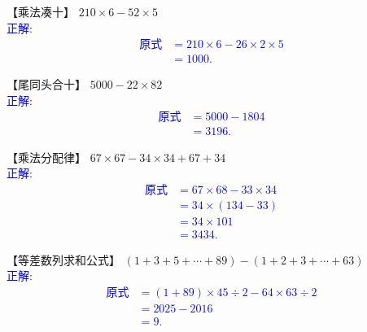 \item {
    【乘法凑十】
    $210\times 6 - 52\times 5$
    \ifshowSolution
        \\\fangsong{}\textcolor{blue}{
            正解:
            \begin{align*}
                \mbox{原式} &= 210\times 6 - 26\times 2\times 5 \\
                &= 1000.
            \end{align*}
        }
    \else
        \vspace{1cm}
    \fi
}

\item {
    【尾同头合十】
    $5000- 22\times 82$  
    \ifshowSolution
        \\\fangsong{}\textcolor{blue}{
            正解:
            \begin{align*}
                \mbox{原式} &= 5000- 1804 \\
                &= 3196.
            \end{align*}
        }
    \else
        \vspace{1cm}
    \fi
}

\item {
    【乘法分配律】
    $67\times 67 - 34\times 34 + 67 + 34$
    \ifshowSolution
        \\\fangsong{}\textcolor{blue}{
            正解:
            \begin{align*}
                \mbox{原式} &= 67\times 68 - 33\times 34 \\
                &= 34\times (134 - 33) \\
                &= 34\times 101 \\
                &= 3434.
            \end{align*}
    }
    \else
        \vspace{1cm}
    \fi
}

\item {
    【等差数列求和公式】
    $(1+3+5+\cdots + 89) - (1+2+3+\cdots + 63)$  
    \ifshowSolution
        \\\fangsong{}\textcolor{blue}{
            正解:
            \begin{align*}
                \mbox{原式} &= (1+ 89) \times 45 \div 2 - 64\times 63\div 2 \\
                &= 2025 - 2016 \\
                &= 9.
            \end{align*}
        }
    \else
        \vspace{1cm}
    \fi
}

